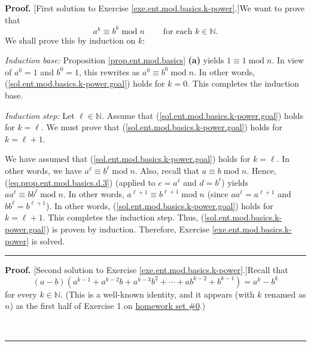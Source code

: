 \documentclass[numbers=enddot,12pt,final,onecolumn,notitlepage]{scrartcl}%
\numberwithin{exer}{subsection}
\theoremstyle{definition}
\newenvironment{fineprint}{\begin{small}}{\end{small}}
\newenvironment{proof}[1][Proof]{\noindent\textbf{#1.} }{\ \rule{0.5em}{0.5em}}
\begin{document}
\begin{fineprint}
\begin{proof}
[First solution to Exercise \ref{exe.ent.mod.basics.k-power}.]We want to prove
that
\begin{equation}
a^{k}\equiv b^{k}\operatorname{mod}n\ \ \ \ \ \ \ \ \ \ \text{for each }%
k\in\mathbb{N}. \label{sol.ent.mod.basics.k-power.goal}%
\end{equation}
We shall prove this by induction on $k$:

\textit{Induction base:} Proposition \ref{prop.ent.mod.basics} \textbf{(a)}
yields $1\equiv1\operatorname{mod}n$. In view of $a^{0}=1$ and $b^{0}=1$, this
rewrites as $a^{0}\equiv b^{0}\operatorname{mod}n$. In other words,
(\ref{sol.ent.mod.basics.k-power.goal}) holds for $k=0$. This completes the
induction base.

\textit{Induction step:} Let $\ell\in\mathbb{N}$. Assume that
(\ref{sol.ent.mod.basics.k-power.goal}) holds for $k=\ell$. We must prove that
(\ref{sol.ent.mod.basics.k-power.goal}) holds for $k=\ell+1$.

We have assumed that (\ref{sol.ent.mod.basics.k-power.goal}) holds for
$k=\ell$. In other words, we have $a^{\ell}\equiv b^{\ell}\operatorname{mod}%
n$. Also, recall that $a\equiv b\operatorname{mod}n$. Hence,
(\ref{eq.prop.ent.mod.basics.d.3}) (applied to $c=a^{\ell}$ and $d=b^{\ell}$)
yields $aa^{\ell}\equiv bb^{\ell}\operatorname{mod}n$. In other words,
$a^{\ell+1}\equiv b^{\ell+1}\operatorname{mod}n$ (since $aa^{\ell}=a^{\ell+1}$
and $bb^{\ell}=b^{\ell+1}$). In other words,
(\ref{sol.ent.mod.basics.k-power.goal}) holds for $k=\ell+1$. This completes
the induction step. Thus, (\ref{sol.ent.mod.basics.k-power.goal}) is proven by
induction. Therefore, Exercise \ref{exe.ent.mod.basics.k-power} is solved.
\end{proof}

\begin{proof}
[Second solution to Exercise \ref{exe.ent.mod.basics.k-power}.]Recall that%
\begin{equation}
\left(  a-b\right)  \left(  a^{k-1}+a^{k-2}b+a^{k-3}b^{2}+\cdots
+ab^{k-2}+b^{k-1}\right)  =a^{k}-b^{k}
\label{sol.exe.ent.mod.basics.k-power.2nd.gs}%
\end{equation}
for every $k\in\mathbb{N}$. (This is a well-known identity, and it appears
(with $k$ renamed as $n$) as the first half of Exercise 1 on
\href{http://www-users.math.umn.edu/~dgrinber/19s/hw0s.pdf}{homework set \#0}.)


\end{proof}
\end{fineprint}
\end{document}
